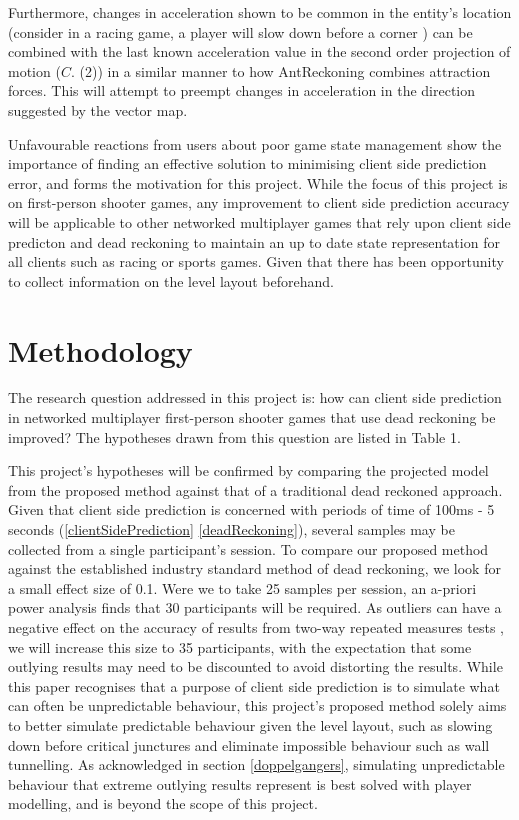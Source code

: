 \documentclass[journal]{IEEEtran}
\begin{document}
Furthermore, changes in acceleration shown to be common in the entity's location (consider in a racing game, a player will slow down before a corner \cite{larsson2016movement}) can be combined with the last known acceleration value in the second order projection of motion ($C.$ (2)) in a similar manner to how AntReckoning combines attraction forces. This will attempt to preempt changes in acceleration in the direction suggested by the vector map.

Unfavourable reactions from users about poor game state management show the importance of finding an effective solution to minimising client side prediction error, and forms the motivation for this project. While the focus of this project is on first-person shooter games, any improvement to client side prediction accuracy will be applicable to other networked multiplayer games that rely upon client side predicton and dead reckoning to maintain an up to date state representation for all clients such as racing or sports games. Given that there has been opportunity to collect information on the level layout beforehand.

\section{Methodology}

The research question addressed in this project is: how can client side prediction in networked multiplayer first-person shooter games that use dead reckoning be improved? The hypotheses drawn from this question are listed in Table 1.

This project's hypotheses will be confirmed by comparing the projected model from the proposed method against that of a traditional dead reckoned approach. Given that client side prediction is concerned with periods of time of 100ms - 5 seconds (\ref{clientSidePrediction} \ref{deadReckoning}), several samples may be collected from a single participant's session. To compare our proposed method against the established industry standard method of dead reckoning, we look for a small effect size of 0.1. Were we to take 25 samples per session, an a-priori power analysis finds that 30 participants will be required. As outliers can have a negative effect on the accuracy of results from two-way repeated measures tests \cite{anova2018laerd}, we will increase this size to 35 participants, with the expectation that some outlying results may need to be discounted to avoid distorting the results. While this paper recognises that a purpose of client side prediction is to simulate what can often be unpredictable behaviour, this project's proposed method solely aims to better simulate predictable behaviour given the level layout, such as slowing down before critical junctures and eliminate impossible behaviour such as wall tunnelling. As acknowledged in section \ref{doppelgangers}, simulating unpredictable behaviour that extreme outlying results represent is best solved with player modelling, and is beyond the scope of this project.
\end{document}
